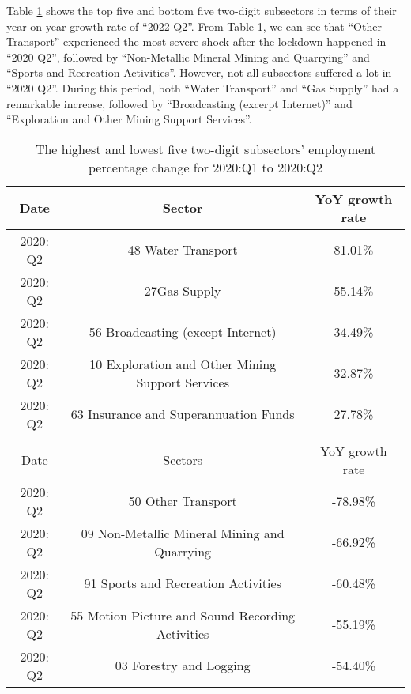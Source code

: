 \documentclass{monashthesis}
\begin{document}
Table \ref{tab:comp} shows the top five and bottom five two-digit subsectors in terms of their year-on-year growth rate of ``2022 Q2''. From Table \ref{tab:comp}, we can see that ``Other Transport'' experienced the most severe shock after the lockdown happened in ``2020 Q2'', followed by ``Non-Metallic Mineral Mining and Quarrying'' and ``Sports and Recreation Activities''. However, not all subsectors suffered a lot in ``2020 Q2''. During this period, both ``Water Transport'' and ``Gas Supply'' had a remarkable increase, followed by ``Broadcasting (excerpt Internet)'' and ``Exploration and Other Mining Support Services''.

\begin{table}[ht]
\begin{center}
\begin{tabular}{ccc}
\hline
Date     & Sector                                        & YoY growth rate \\
\hline
2020: Q2  & 48 Water Transport                            & 81.01\%                                \\
2020: Q2 & 27Gas Supply      & 55.14\%                                \\

2020: Q2 & 56 Broadcasting (except Internet)                            & 34.49\%                                \\
2020: Q2 & 10 Exploration and Other Mining Support Services                     & 32.87\%                                \\
2020: Q2 & 63 Insurance and Superannuation Funds & 27.78\% 
                 \\
                 \\
                 \hline
Date     &  Sectors                                      &YoY growth rate \\
                 \hline
2020: Q2 & 50 Other Transport                 &-78.98\%  
                 \\
2020: Q2 & 09 Non-Metallic Mineral Mining and Quarrying    & -66.92\% 
                 \\
2020: Q2 & 91 Sports and Recreation Activities & -60.48\% 
                 \\
2020: Q2 & 55 Motion Picture and Sound Recording Activities                           & -55.19\%  
                 \\
2020: Q2 & 03 Forestry and Logging         & -54.40\%
\end{tabular}
\end{center}
\caption{The highest and lowest five two-digit subsectors' employment percentage change for 2020:Q1 to 2020:Q2 }
\label{tab:comp}
\end{table}
\end{document}
